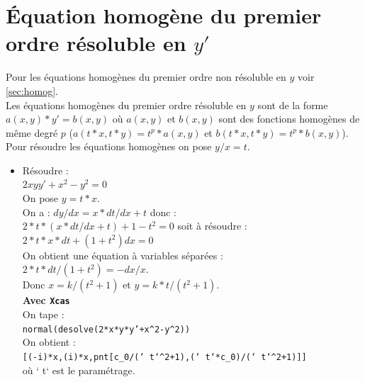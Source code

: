 \documentclass[a4paper,11pt]{book}
\begin{document}
\section{\'Equation homog\`ene du premier ordre r\'esoluble en $y'$}
Pour les \'equations homog\`enes du premier ordre non r\'esoluble en $y$ voir
\ref{sec:homog}.\\
Les \'equations homog\`enes du premier ordre r\'esoluble en $y$ sont de la 
forme $a(x,y)*y'=b(x,y)$ o\`u $a(x,y)$ et $b(x,y)$ sont des fonctions 
homog\`enes de m\^eme degr\'e $p$ ($a(t*x,t*y)=t^p*a(x,y)$ et 
$b(t*x,t*y)=t^p*b(x,y)$).\\
Pour r\'esoudre les \'equations homog\`enes on pose $y/x=t$. 
\begin{itemize} 
\item  R\'esoudre :\\
$2xyy'+x^2-y^2=0$\\
On pose $y=t*x$.\\
On a : $dy/dx=x*dt/dx+t$ donc :\\
$2*t*(x*dt/dx+t)+1-t^2=0$ soit \`a r\'esoudre :\\
$2*t*x*dt+(1+t^2)dx=0$\\
On obtient une \'equation \`a variables s\'epar\'ees :\\
$2*t*dt/(1+t^2)=-dx/x$.\\
Donc $x=k/(t^2+1)$ et $y=k*t/(t^2+1)$.\\
{\bf Avec {\tt Xcas}}\\
On tape :\\
{\tt normal(desolve(2*x*y*y'+x\verb|^|2-y\verb|^|2))}\\
On obtient :\\
{\tt [(-i)*x,(i)*x,pnt[c\_0/(` t`\verb|^|2+1),(` t`*c\_0)/(` t`\verb|^|2+1)]]}\\
o\`u ` t` est le param\'etrage.\\


\end{itemize}
\end{document}
